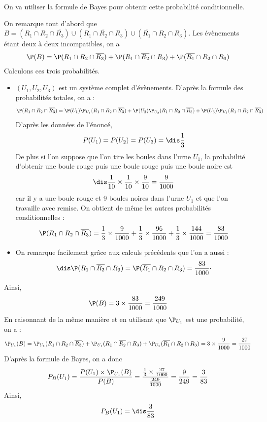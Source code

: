 \documentclass[a4paper,10pt]{report}
\begin{document}
\noindent On va utiliser la formule de Bayes pour obtenir cette probabilité conditionnelle.

\vspace{0.2cm}

\noindent On remarque tout d'abord que $B = (R_1 \cap R_2 \cap \overline{R_3}) \cup (R_1 \cap \overline{R_2} \cap R_3) \cup (\overline{R_1} \cap R_2 \cap R_3)$. Les évènements étant deux à deux incompatibles, on a 
\[ \P(B) = \P( R_1 \cap R_2 \cap \overline{R_3}) + \P(R_1 \cap \overline{R_2} \cap R_3) + \P(\overline{R_1} \cap R_2 \cap R_3) \]
\noindent Calculons ces trois probabilités.

\begin{itemize}
\item $(U_1,U_2,U_3)$ est un système complet d'évènements. D'après la formule des probabilités totales, on a : 
\[ \P( R_1 \cap R_2 \cap \overline{R_3}) = \P(U_1) \P_{U_1}( R_1 \cap R_2 \cap \overline{R_3}) + \P(U_2) \P_{U_2}( R_1 \cap R_2 \cap \overline{R_3}) + \P(U_3) \P_{U_3}( R_1 \cap R_2 \cap \overline{R_3}) \]
D'après les données de l'énoncé, 
$$P(U_1)= P(U_2)= P(U_3)= \dis \frac{1}{3}$$
De plus si l'on suppose que l'on tire les boules dans l'urne $U_1$, la probabilité d'obtenir une boule rouge puis une boule rouge puis une boule noire est 
$$\dis \frac{1}{10} \times \frac{1}{10} \times \frac{9}{10} = \frac{9}{1000}$$ car il y a une boule rouge et 9 boules noires dans l'urne $U_1$ et que l'on travaille avec remise. On obtient de même les autres probabilités conditionnelles :
\[ \P( R_1 \cap R_2 \cap \overline{R_3}) = \frac{1}{3} \times \frac{9}{1000} + \frac{1}{3} \times \frac{96}{1000} + \frac{1}{3} \times \frac{144}{1000} = \frac{83}{1000} \]
\item On remarque facilement grâce aux calculs précédents que l'on a aussi :
$$\dis \P(R_1 \cap \overline{R_2} \cap R_3) = \P(\overline{R_1} \cap R_2 \cap R_3) = \frac{83}{1000} \cdot$$
\end{itemize}
Ainsi, 
$$ \P(B) = 3 \times \frac{83}{1000} = \frac{249}{1000}$$
En raisonnant de la même manière et en utilisant que $\P_{U_1}$ est une probabilité, on a :
\[ \P_{U_1}(B) =  \P_{U_1}(R_1 \cap R_2 \cap \overline{R_3}) + \P_{U_1}(R_1 \cap \overline{R_2} \cap R_3) + \P_{U_1} (\overline{R_1} \cap R_2 \cap R_3) = 3 \times \frac{9}{1000} = \frac{27}{1000} \]
D'après la formule de Bayes, on a donc 
\[ P_{B}(U_1) = \frac{P(U_1) \times \P_{U_1}(B) }{P(B)} = \frac{\frac{1}{3} \times \frac{27}{1000}}{\frac{249}{1000}} = \frac{9}{249} = \frac{3}{83} \]
Ainsi,
$$ P_{B}(U_1) = \dis \frac{3}{83} $$
\end{document}
